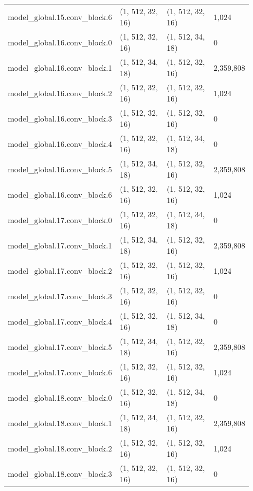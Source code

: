 \begin{longtable}{llll}
        model\_global.15.conv\_block.6 &   (1, 512, 32, 16) &   (1, 512, 32, 16) &       1,024 \\
        model\_global.16.conv\_block.0 &   (1, 512, 32, 16) &   (1, 512, 34, 18) &           0 \\
        model\_global.16.conv\_block.1 &   (1, 512, 34, 18) &   (1, 512, 32, 16) &   2,359,808 \\
        model\_global.16.conv\_block.2 &   (1, 512, 32, 16) &   (1, 512, 32, 16) &       1,024 \\
        model\_global.16.conv\_block.3 &   (1, 512, 32, 16) &   (1, 512, 32, 16) &           0 \\
        model\_global.16.conv\_block.4 &   (1, 512, 32, 16) &   (1, 512, 34, 18) &           0 \\
        model\_global.16.conv\_block.5 &   (1, 512, 34, 18) &   (1, 512, 32, 16) &   2,359,808 \\
        model\_global.16.conv\_block.6 &   (1, 512, 32, 16) &   (1, 512, 32, 16) &       1,024 \\
        model\_global.17.conv\_block.0 &   (1, 512, 32, 16) &   (1, 512, 34, 18) &           0 \\
        model\_global.17.conv\_block.1 &   (1, 512, 34, 18) &   (1, 512, 32, 16) &   2,359,808 \\
        model\_global.17.conv\_block.2 &   (1, 512, 32, 16) &   (1, 512, 32, 16) &       1,024 \\
        model\_global.17.conv\_block.3 &   (1, 512, 32, 16) &   (1, 512, 32, 16) &           0 \\
        model\_global.17.conv\_block.4 &   (1, 512, 32, 16) &   (1, 512, 34, 18) &           0 \\
        model\_global.17.conv\_block.5 &   (1, 512, 34, 18) &   (1, 512, 32, 16) &   2,359,808 \\
        model\_global.17.conv\_block.6 &   (1, 512, 32, 16) &   (1, 512, 32, 16) &       1,024 \\
        model\_global.18.conv\_block.0 &   (1, 512, 32, 16) &   (1, 512, 34, 18) &           0 \\
        model\_global.18.conv\_block.1 &   (1, 512, 34, 18) &   (1, 512, 32, 16) &   2,359,808 \\
        model\_global.18.conv\_block.2 &   (1, 512, 32, 16) &   (1, 512, 32, 16) &       1,024 \\
        model\_global.18.conv\_block.3 &   (1, 512, 32, 16) &   (1, 512, 32, 16) &           0 \\

\end{longtable}
